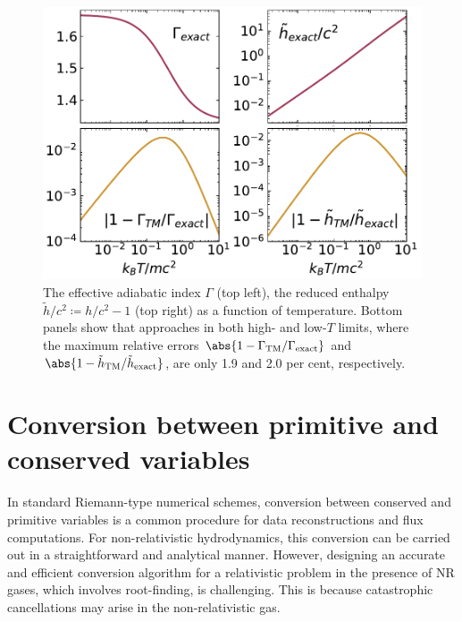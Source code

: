 \begin{figure}
	\includegraphics[width=\columnwidth]{figures/compare_eos.pdf}
    \caption{The effective adiabatic index $\Gamma$ (top left), the reduced enthalpy $\tilde{h}/c^2\coloneqq h/c^2-1$ (top right) as a function of temperature. Bottom panels show that  approaches  in both high- and low-$T$ limits, where the maximum relative errors $\abs{1-\Gamma_{\text{TM}}/\Gamma_{\text{exact}}}$ and $\abs{1-\tilde{h}_{\text{TM}}/\tilde{h}_{\text{exact}}}$, are only 1.9 and 2.0 per cent, respectively.}
   \label{fig:compare_eos}
\end{figure}


\section{Conversion between primitive and conserved variables}
\label{section: Conversion between primitive variables and conserved ones}
In standard Riemann-type numerical schemes, conversion between conserved and primitive variables is a common procedure for data reconstructions and flux computations. For non-relativistic hydrodynamics, this conversion can be carried out in a straightforward and analytical manner. However, designing an accurate and efficient conversion algorithm for a relativistic problem in the presence of NR gases, which involves root-finding, is challenging. This is because catastrophic cancellations may arise in the non-relativistic gas.

